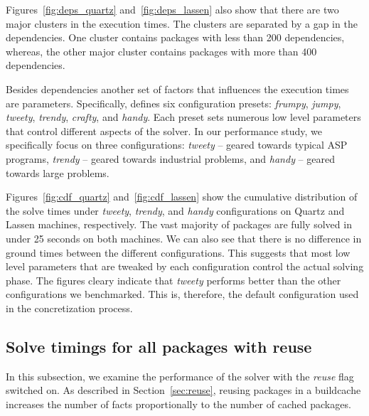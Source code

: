 Figures~\ref{fig:deps_quartz} and~\ref{fig:deps_lassen} also show that there are two major clusters in the execution times. The clusters are separated by a gap in the dependencies. One cluster contains packages with less than 200 dependencies, whereas, the other major cluster contains packages with more than 400 dependencies. 


Besides dependencies another set of factors that influences the execution times are \clingo{} parameters. Specifically, \clingo{} defines six configuration presets: \emph{frumpy}, \emph{jumpy}, \emph{tweety}, \emph{trendy}, \emph{crafty}, and \emph{handy}. Each preset sets numerous low level parameters that control different aspects of the solver. In our performance study, we specifically focus on three configurations: \emph{tweety} -- geared towards typical ASP programs, \emph{trendy} -- geared towards industrial problems, and \emph{handy} -- geared towards large problems.





Figures~\ref{fig:cdf_quartz} and~\ref{fig:cdf_lassen} show the cumulative distribution of the solve times under \emph{tweety}, \emph{trendy}, and \emph{handy} configurations on Quartz and Lassen machines, respectively. The vast majority of packages are fully solved in under 25 seconds on both machines. We can also see that there is no difference in ground times between the different configurations. This suggests that most low level parameters that are tweaked by each configuration control the actual solving phase. The figures cleary indicate that \emph{tweety} performs better than the other configurations we benchmarked. This is, therefore, the default configuration used in the concretization process. 


\subsection{Solve timings for all packages with reuse}

In this subsection, we examine the performance of the solver with the \emph{reuse} flag switched on. As described in Section~\ref{sec:reuse}, reusing packages in a buildcache increases the number of facts proportionally to the number of cached packages.

